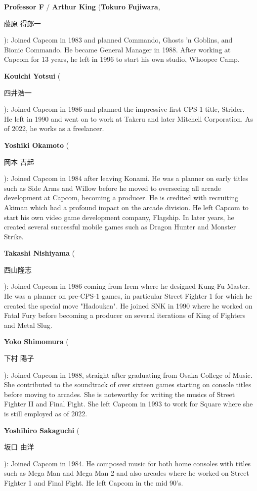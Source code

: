 \textbf{Professor F} / \textbf{Arthur King} (\textbf{Tokuro Fujiwara}, \begin{CJK}{UTF8}{min}藤原 得郎一\end{CJK}): Joined Capcom in 1983 and planned Commando, Ghosts 'n Goblins, and Bionic Commando. He became General Manager in 1988. After working at Capcom for 13 years, he left in 1996 to start his own studio, Whoopee Camp.

\textbf{Kouichi Yotsui} (\begin{CJK}{UTF8}{min}四井浩一\end{CJK}): Joined Capcom in 1986 and planned the impressive first CPS-1 title, Strider. He left in 1990 and went on to work at Takeru and later Mitchell Corporation. As of 2022, he works as a freelancer.

\textbf{Yoshiki Okamoto} (\begin{CJK}{UTF8}{min}岡本 吉起\end{CJK}): Joined Capcom in 1984 after leaving Konami. He was a planner on early titles such as Side Arms and Willow before he moved to overseeing all arcade development at Capcom, becoming a producer. He is credited with recruiting Akiman which had a profound impact on the arcade division. He left Capcom to start his own video game development company, Flagship. In later years, he created several successful mobile games such as Dragon Hunter and Monster Strike.   

\textbf{Takashi Nishiyama} (\begin{CJK}{UTF8}{min}西山隆志\end{CJK}): Joined Capcom in 1986 coming from Irem where he designed Kung-Fu Master. He was a planner on pre-CPS-1 games, in particular Street Fighter 1 for which he created the special move "Hadouken". He joined SNK in 1990 where he worked on Fatal Fury before becoming a producer on several iterations of King of Fighters and Metal Slug.


\textbf{Yoko Shimomura} (\begin{CJK}{UTF8}{min}下村 陽子\end{CJK}): Joined Capcom in 1988, straight after graduating from Osaka College of Music. She contributed to the soundtrack of over sixteen games starting on console titles before moving to arcades. She is noteworthy for writing the musics of Street Fighter II and Final Fight. She left Capcom in 1993 to work for Square where she is still employed as of 2022.

\textbf{Yoshihiro Sakaguchi} (\begin{CJK}{UTF8}{min}坂口 由洋\end{CJK}): Joined Capcom in 1984. He composed music for both home consoles with titles such as Mega Man and Mega Man 2 and also arcades where he worked on Street Fighter 1 and Final Fight. He left Capcom in the mid 90's.